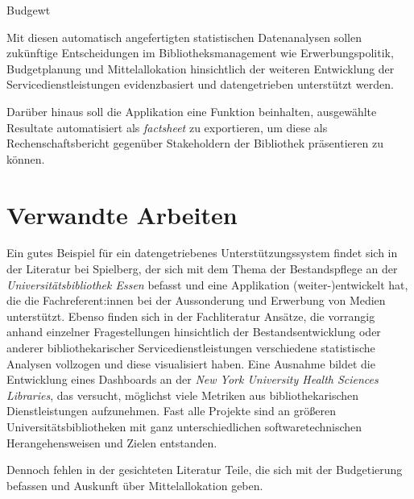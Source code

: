 Budgewt



Mit diesen automatisch angefertigten statistischen Datenanalysen sollen zukünftige
Entscheidungen im Bibliotheksmanagement wie Erwerbungspolitik, Budgetplanung und
Mittelallokation hinsichtlich der weiteren Entwicklung der
Servicedienstleistungen evidenzbasiert und datengetrieben unterstützt werden.

Darüber hinaus soll die Applikation  eine Funktion beinhalten, ausgewählte
Resultate automatisiert als \textit{factsheet} zu exportieren, um diese
als Rechenschaftsbericht gegenüber Stakeholdern der Bibliothek präsentieren zu können.

\section{Verwandte Arbeiten}


Ein gutes Beispiel für ein datengetriebenes Unterstützungssystem findet sich in
der Literatur bei Spielberg, der sich mit dem Thema der Bestandspflege an der
\textit{Universitätsbibliothek Essen} befasst und eine Applikation (weiter-)entwickelt hat, die
die Fachreferent:innen bei der Aussonderung und Erwerbung von Medien
unterstützt.\cite{spielberg_eike_t_fachref-assistent_nodate}
Ebenso finden sich in der Fachliteratur Ansätze, die vorrangig anhand einzelner
Fragestellungen hinsichtlich der Bestandsentwicklung\cite{hughes_long-term_2016} oder anderer
bibliothekarischer Servicedienstleistungen\cite{kutlay_shiny_2020, knievel_use_2006,meyer_using_2018} verschiedene statistische Analysen
vollzogen und diese visualisiert haben.
Eine Ausnahme bildet die Entwicklung eines Dashboards an der \textit{New York
University Health Sciences Libraries}, das versucht, möglichst viele Metriken
aus bibliothekarischen Dienstleistungen aufzunehmen.\cite{morton-owens_trends_2012}
Fast alle Projekte sind an größeren
Universitätsbibliotheken mit ganz unterschiedlichen softwaretechnischen
Herangehensweisen\cite{finch_using_2016, wiegand_visualizing_2013} und Zielen\cite{phetteplace_effectively_2012} entstanden.

Dennoch fehlen in der gesichteten Literatur Teile, die sich mit der Budgetierung
befassen und Auskunft über Mittelallokation geben.

